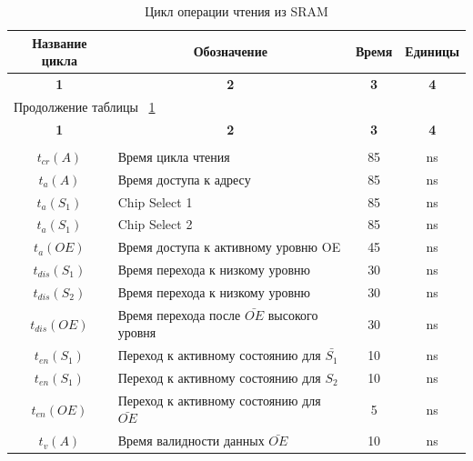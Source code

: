 \begin{center}
\begin{longtable}{|c|p{7cm}|c|c|}
\caption{Цикл операции чтения из SRAM} \label{tab:sram_read_cycle} \\ \hline
\multicolumn{1}{|p{3cm}|}{\textbf{Название цикла}}    &   \multicolumn{1}{c|}{\textbf{Обозначение}} & 
\multicolumn{1}{|c|}{\textbf{Время}}    &   \multicolumn{1}{c|}{\textbf{Единицы}} \\ \hline

\multicolumn{1}{|c|}{\textbf{1}}    &   \multicolumn{1}{|c|}{\textbf{2}} &
\multicolumn{1}{|c|}{\textbf{3}}    &   \multicolumn{1}{|c|}{\textbf{4}} \\ \hline
\endfirsthead

\multicolumn{2}{|l|}{{Продолжение таблицы ~\ref{tab:sram_read_cycle}}} \\ %
\hline
\multicolumn{1}{|c|}{\textbf{1}}    &   \multicolumn{1}{|c|}{\textbf{2}} &
\multicolumn{1}{|c|}{\textbf{3}}    &   \multicolumn{1}{|c|}{\textbf{4}} \\ \hline
\endhead
\endfoot

	\hline
		 &  &  &  \\
	\hline
		${t_{cr}(A)}$ & Время цикла чтения & 85 & ns \\
	\hline
		${t_a(A)}$ & Время доступа к адресу & 85 & ns \\
	\hline
		${t_a(S_1)}$ & Chip Select 1 & 85 & ns \\
	\hline
		${t_a(S_1)}$ & Chip Select 2 & 85 & ns \\
	\hline
		${t_a(OE)}$ & Время доступа к активному уровню OE & 45 & ns \\
	\hline
		${t_{dis}(S_1)}$ & Время перехода к низкому уровню & 30 & ns \\
	\hline
		${t_{dis}(S_2)}$ & Время перехода к низкому уровню & 30 & ns \\
	\hline
		${t_{dis}(OE)}$ & Время перехода после $\bar{OE}$ высокого уровня & 30 & ns \\
	\hline
		${t_{en}(S_1)}$ & Переход к активному состоянию для $\bar{S_1}$ & 10 & ns \\
	\hline
		${t_{en}(S_1)}$ & Переход к активному состоянию для ${S_2}$ & 10 & ns \\
	\hline
		${t_{en}(OE)}$ & Переход к активному состоянию для $\bar{OE}$ & 5 & ns \\
	\hline
		${t_{v}(A)}$ & Время валидности данных $\bar{OE}$ & 10 & ns \\
	\hline

\end{longtable}
\end{center}

